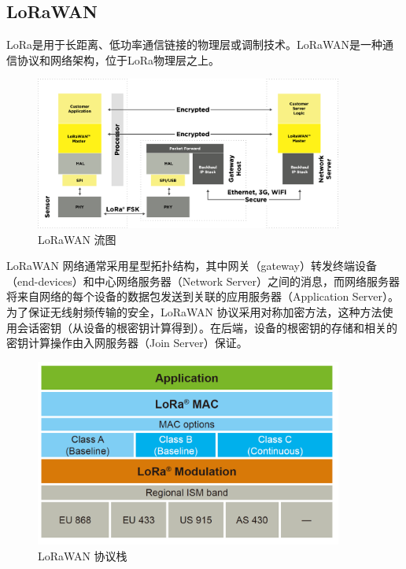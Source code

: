 \documentclass[scheme=chinese,a4paper]{article}
\begin{document}
\subsection{LoRaWAN}
LoRa是用于长距离、低功率通信链接的物理层或调制技术。LoRaWAN是一种通信协议和网络架构，位于LoRa物理层之上。
\begin{figure}[H]
  \centering
  \includegraphics[width=0.9\textwidth]{LA_System_0.png}
  \caption{LoRaWAN 流图}
  \end{figure}
LoRaWAN 网络通常采用星型拓扑结构，其中网关（gateway）转发终端设备（end-devices）和中心网络服务器（Network Server）之间的消息，而网络服务器将来自网络的每个设备的数据包发送到关联的应用服务器（Application Server）。为了保证无线射频传输的安全，LoRaWAN 协议采用对称加密方法，这种方法使用会话密钥（从设备的根密钥计算得到）。在后端，设备的根密钥的存储和相关的密钥计算操作由入网服务器（Join Server）保证。
\begin{figure}[H]
\centering
\includegraphics[width=0.9\textwidth]{lorawan.png}
\caption{LoRaWAN 协议栈}
\end{figure}
\end{document}
